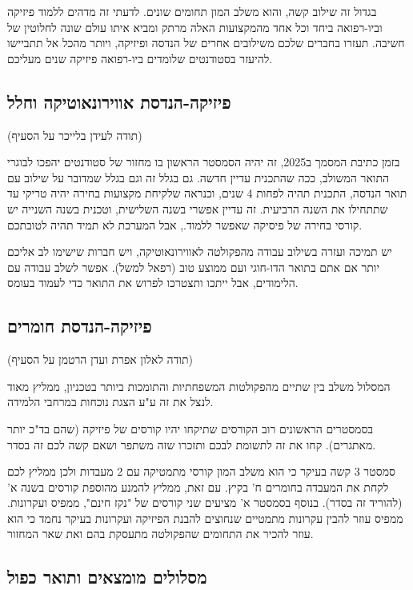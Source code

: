 \documentclass[a4paper,12pt]{article}
\begin{document}
בגדול זה שילוב קשה, והוא משלב המון תחומים שונים. לדעתי זה מדהים ללמוד פיזיקה וביו-רפואה ביחד וכל אחד מהמקצועות האלה מרתק ומביא איתו עולם שונה לחלוטין של חשיבה. תעזרו בחברים שלכם משילובים אחרים של הנדסה ופיזיקה, ויותר מהכל אל תתביישו להיעזר בסטודנטים שלומדים ביו-רפואה פיזיקה שנים מעליכם.

\subsection{פיזיקה-הנדסת אווירונאוטיקה וחלל}

(תודה לעידן בלייכר על הסעיף)

בזמן כתיבת המסמך ב2025, זה יהיה הסמסטר הראשון בו מחזור של סטודנטים יהפכו לבוגרי התואר המשולב, ככה שהתכנית עדיין חדשה. גם בגלל זה וגם בגלל שמדובר על שילוב עם תואר הנדסה, התכנית תהיה לפחות 4 שנים, וכנראה שלקיחת מקצועות בחירה יהיה טריקי עד שתתחילו את השנה הרביעית. זה עדיין אפשרי בשנה השלישית, וטכנית בשנה השנייה יש קורסי בחירה של פיסיקה שאפשר ללמוד., אבל המערכת לא תמיד תהיה לטובתכם.  

יש תמיכה ועזרה בשילוב עבודה מהפקולטה לאווירונאוטיקה, ויש חברות שישימו לב אליכם יותר אם אתם בתואר הדו-חוגי ועם ממוצע טוב (רפאל למשל). אפשר לשלב עבודה עם הלימודים, אבל ייתכו ותצטרכו לפרוש את התואר כדי לעמוד בעומס. 

\subsection{פיזיקה-הנדסת חומרים}

(תודה לאלון אפרת ועדן הרטמן על הסעיף)

המסלול משלב בין שתיים מהפקולטות המשפחתיות והתומכות ביותר בטכניון, ממליץ מאוד לנצל את זה ע"ע הצגת נוכחות במרחבי הלמידה.

בסמסטרים הראשונים רוב הקורסים שתיקחו יהיו קורסים של פיזיקה (שהם בד"כ יותר מאתגרים). קחו את זה לתשומת לבכם ותזכרו שזה משתפר ושאם קשה לכם זה בסדר.

סמסטר 3 קשה בעיקר כי הוא משלב המון קורסי מתמטיקה עם 2 מעבדות ולכן ממליץ לכם לקחת את המעבדה בחומרים ח' בקיץ. עם זאת, ממליץ להמנע מהוספת קורסים בשנה א' (להוריד זה בסדר). בנוסף בסמסטר א' מציעים שני קורסים של "נקז חינם", ממפיס ועקרונות. ממפיס עוזר להבין עקרונות מתמטיים שנחוצים להבנת הפיזיקה ועקרונות בעיקר נחמד כי הוא עוזר להכיר את התחומים שהפקולטה מתעסקת בהם ואת שאר המחזור.

\subsection{מסלולים מומצאים ותואר כפול}
\end{document}
